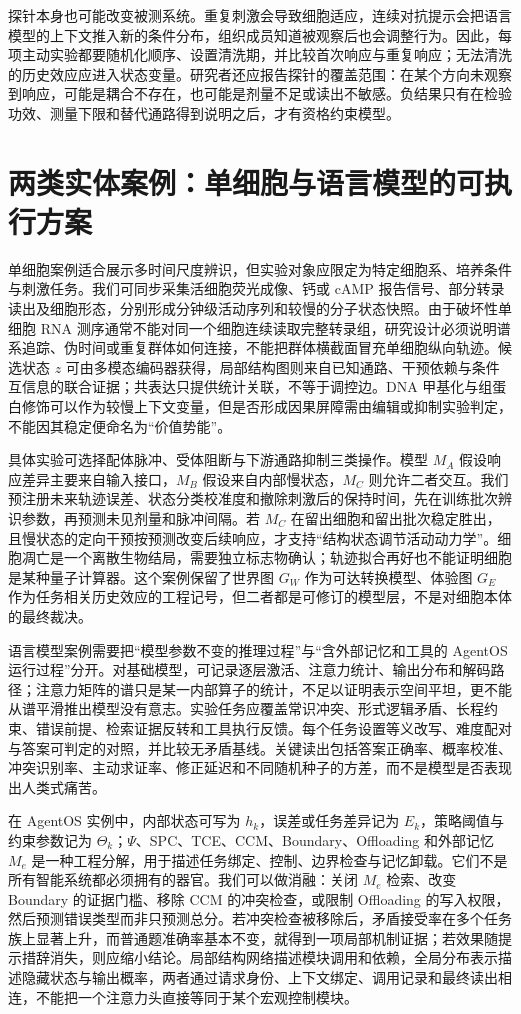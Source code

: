 探针本身也可能改变被测系统。重复刺激会导致细胞适应，连续对抗提示会把语言模型的上下文推入新的条件分布，组织成员知道被观察后也会调整行为。因此，每项主动实验都要随机化顺序、设置清洗期，并比较首次响应与重复响应；无法清洗的历史效应应进入状态变量。研究者还应报告探针的覆盖范围：在某个方向未观察到响应，可能是耦合不存在，也可能是剂量不足或读出不敏感。负结果只有在检验功效、测量下限和替代通路得到说明之后，才有资格约束模型。

\section{两类实体案例：单细胞与语言模型的可执行方案}
\label{sec:holographic_anatomy_cases}

单细胞案例适合展示多时间尺度辨识，但实验对象应限定为特定细胞系、培养条件与刺激任务。我们可同步采集活细胞荧光成像、钙或 cAMP 报告信号、部分转录读出及细胞形态，分别形成分钟级活动序列和较慢的分子状态快照。由于破坏性单细胞 RNA 测序通常不能对同一个细胞连续读取完整转录组，研究设计必须说明谱系追踪、伪时间或重复群体如何连接，不能把群体横截面冒充单细胞纵向轨迹。候选状态 $z$ 可由多模态编码器获得，局部结构图则来自已知通路、干预依赖与条件互信息的联合证据；共表达只提供统计关联，不等于调控边。DNA 甲基化与组蛋白修饰可以作为较慢上下文变量，但是否形成因果屏障需由编辑或抑制实验判定，不能因其稳定便命名为“价值势能”。

具体实验可选择配体脉冲、受体阻断与下游通路抑制三类操作。模型 $M_A$ 假设响应差异主要来自输入接口，$M_B$ 假设来自内部慢状态，$M_C$ 则允许二者交互。我们预注册未来轨迹误差、状态分类校准度和撤除刺激后的保持时间，先在训练批次辨识参数，再预测未见剂量和脉冲间隔。若 $M_C$ 在留出细胞和留出批次稳定胜出，且慢状态的定向干预按预测改变后续响应，才支持“结构状态调节活动动力学”。细胞凋亡是一个离散生物结局，需要独立标志物确认；轨迹拟合再好也不能证明细胞是某种量子计算器。这个案例保留了世界图 $G_W$ 作为可达转换模型、体验图 $G_E$ 作为任务相关历史效应的工程记号，但二者都是可修订的模型层，不是对细胞本体的最终裁决。

语言模型案例需要把“模型参数不变的推理过程”与“含外部记忆和工具的 AgentOS 运行过程”分开。对基础模型，可记录逐层激活、注意力统计、输出分布和解码路径；注意力矩阵的谱只是某一内部算子的统计，不足以证明表示空间平坦，更不能从谱平滑推出模型没有意志。实验任务应覆盖常识冲突、形式逻辑矛盾、长程约束、错误前提、检索证据反转和工具执行反馈。每个任务设置等义改写、难度配对与答案可判定的对照，并比较无矛盾基线。关键读出包括答案正确率、概率校准、冲突识别率、主动求证率、修正延迟和不同随机种子的方差，而不是模型是否表现出人类式痛苦。

在 AgentOS 实例中，内部状态可写为 $h_k$，误差或任务差异记为 $E_k$，策略阈值与约束参数记为 $\Theta_k$；$\Psi$、SPC、TCE、CCM、Boundary、Offloading 和外部记忆 $M_e$ 是一种工程分解，用于描述任务绑定、控制、边界检查与记忆卸载。它们不是所有智能系统都必须拥有的器官。我们可以做消融：关闭 $M_e$ 检索、改变 Boundary 的证据门槛、移除 CCM 的冲突检查，或限制 Offloading 的写入权限，然后预测错误类型而非只预测总分。若冲突检查被移除后，矛盾接受率在多个任务族上显著上升，而普通题准确率基本不变，就得到一项局部机制证据；若效果随提示措辞消失，则应缩小结论。局部结构网络描述模块调用和依赖，全局分布表示描述隐藏状态与输出概率，两者通过请求身份、上下文绑定、调用记录和最终读出相连，不能把一个注意力头直接等同于某个宏观控制模块。

